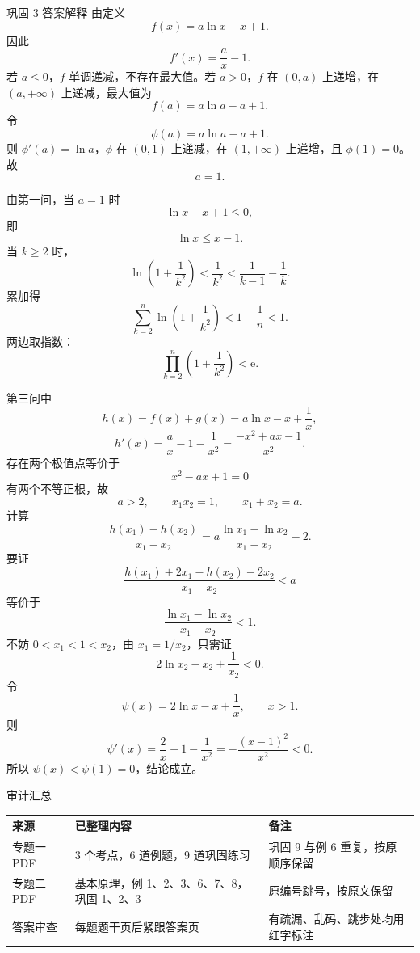 ﻿\documentclass[aspectratio=169,10pt]{ctexbeamer}
\newcommand{\e}{\mathrm e}
\begin{document}
\begin{frame}[allowframebreaks]{巩固 3 答案解释}
\small
由定义
\[
f(x)=a\ln x-x+1.
\]
因此
\[
f'(x)=\frac ax-1.
\]
若 $a\le0$，$f$ 单调递减，不存在最大值。若 $a>0$，$f$ 在 $(0,a)$ 上递增，在 $(a,+\infty)$ 上递减，最大值为
\[
f(a)=a\ln a-a+1.
\]
令
\[
\phi(a)=a\ln a-a+1.
\]
则 $\phi'(a)=\ln a$，$\phi$ 在 $(0,1)$ 上递减，在 $(1,+\infty)$ 上递增，且 $\phi(1)=0$。故
\[
\boxed{a=1}.
\]

\framebreak

由第一问，当 $a=1$ 时
\[
\ln x-x+1\le0,
\]
即
\[
\ln x\le x-1.
\]
当 $k\ge2$ 时，
\[
\ln\left(1+\frac1{k^2}\right)
<\frac1{k^2}
<\frac1{k-1}-\frac1k.
\]
累加得
\[
\sum_{k=2}^n\ln\left(1+\frac1{k^2}\right)
<1-\frac1n<1.
\]
两边取指数：
\[
\prod_{k=2}^n\left(1+\frac1{k^2}\right)<\e.
\]

\framebreak

第三问中
\[
h(x)=f(x)+g(x)=a\ln x-x+\frac1x,
\]
\[
h'(x)=\frac ax-1-\frac1{x^2}
=\frac{-x^2+ax-1}{x^2}.
\]
存在两个极值点等价于
\[
x^2-ax+1=0
\]
有两个不等正根，故
\[
a>2,\qquad x_1x_2=1,\qquad x_1+x_2=a.
\]
计算
\[
\frac{h(x_1)-h(x_2)}{x_1-x_2}
=a\frac{\ln x_1-\ln x_2}{x_1-x_2}-2.
\]
要证
\[
\frac{h(x_1)+2x_1-h(x_2)-2x_2}{x_1-x_2}<a
\]
等价于
\[
\frac{\ln x_1-\ln x_2}{x_1-x_2}<1.
\]
不妨 $0<x_1<1<x_2$，由 $x_1=1/x_2$，只需证
\[
2\ln x_2-x_2+\frac1{x_2}<0.
\]
令
\[
\psi(x)=2\ln x-x+\frac1x,\qquad x>1.
\]
则
\[
\psi'(x)=\frac2x-1-\frac1{x^2}
=-\frac{(x-1)^2}{x^2}<0.
\]
所以 $\psi(x)<\psi(1)=0$，结论成立。
\end{frame}

\begin{frame}{审计汇总}
\small
\begin{tabular}{@{}lll@{}}
\toprule
来源 & 已整理内容 & 备注\\
\midrule
专题一 PDF & 3 个考点，6 道例题，9 道巩固练习 & 巩固 9 与例 6 重复，按原顺序保留\\
专题二 PDF & 基本原理，例 1、2、3、6、7、8，巩固 1、2、3 & 原编号跳号，按原文保留\\
答案审查 & 每题题干页后紧跟答案页 & 有疏漏、乱码、跳步处均用红字标注\\
\bottomrule
\end{tabular}
\end{frame}
\end{document}
